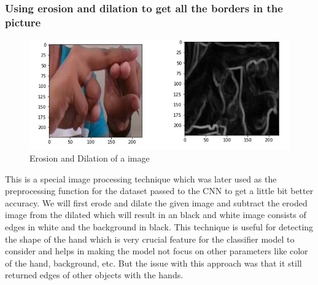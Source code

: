 \documentclass[12pt,a4paper]{report}
\begin{document}
\subsubsection{Using erosion and dilation to get all the borders in the picture}
\begin{figure}[htbp]
	\centerline{\includegraphics[scale=0.5]{erosion_dilation.jpg}}
	\caption{Erosion and Dilation of a image}
	\label{Erosion_dilation}
\end{figure}
This is a special image processing technique which was later used as the preprocessing function for the dataset passed to the CNN to get a little bit better accuracy. We will first erode and dilate the given image and subtract the eroded image from the dilated which will result in an black and white image consists of edges in white and the background in black. This technique is useful for detecting the shape of the hand which is very crucial feature for the classifier model to consider and helps in making the model not focus on other parameters like color of the hand, background, etc. But the issue with this approach was that it still returned edges of other objects with the hands.
\end{document}
